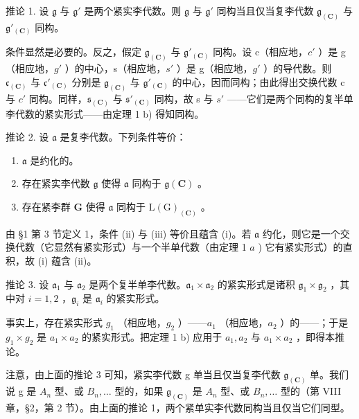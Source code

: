 推论 1. 设 \(\mathfrak{g}\) 与 \(\mathfrak{g}'\) 是两个紧实李代数。则 \(\mathfrak{g}\) 与 \(\mathfrak{g}'\) 同构当且仅当复李代数 \(\mathfrak{g}_{(\mathbf{C})}\) 与 \(\mathfrak{g}'_{(\mathbf{C})}\) 同构。

条件显然是必要的。反之，假定 \(\mathfrak{g}_{(\mathbf{C})}\) 与 \(\mathfrak{g}'_{(\mathbf{C})}\) 同构。设 c（相应地，\(c'\) ）是 g（相应地，\(g'\) ）的中心，s（相应地，\(s'\) ）是 g（相应地，\(g'\) ）的导代数。则 \(\mathfrak{c}_{(\mathbf{C})}\) 与 \(\mathfrak{c}'_{(\mathbf{C})}\) 分别是 \(\mathfrak{g}_{(\mathbf{C})}\) 与 \(\mathfrak{g}'_{(\mathbf{C})}\) 的中心，因而同构；由此得出交换代数 c 与 \(c'\) 同构。同样，\(\mathfrak{s}_{(\mathbf{C})}\) 与 \(\mathfrak{s}'_{(\mathbf{C})}\) 同构，故 s 与 \(s'\) ——它们是两个同构的复半单李代数的紧实形式——由定理 1 b) 得知同构。

推论 2. 设 \(\mathfrak{a}\) 是复李代数。下列条件等价：

\begin{enumerate}
\def\labelenumi{(\roman{enumi})}
\item
  \(\mathfrak{a}\) 是约化的。
\item
  存在紧实李代数 \(\mathfrak{g}\) 使得 \(\mathfrak{a}\) 同构于 \(\mathfrak{g}(\mathbf{C})\) 。
\item
  存在紧李群 \(\mathbf{G}\) 使得 \(\mathfrak{a}\) 同构于 \(\mathrm{L}(\mathrm{G})_{(\mathbf{C})}\) 。
\end{enumerate}

由 §1 第 3 节定义 1，条件 (ii) 与 (iii) 等价且蕴含 (i)。若 \(\mathfrak{a}\) 约化，则它是一个交换代数（它显然有紧实形式）与一个半单代数（由定理 1 \(a\) ) 它有紧实形式）的直积，故 (i) 蕴含 (ii)。

推论 3. 设 \(\mathfrak{a}_1\) 与 \(\mathfrak{a}_2\) 是两个复半单李代数。\(\mathfrak{a}_1 \times \mathfrak{a}_2\) 的紧实形式是诸积 \(\mathfrak{g}_1 \times \mathfrak{g}_2\) ，其中对 \(i = 1, 2\) ，\(\mathfrak{g}_i\) 是 \(\mathfrak{a}_i\) 的紧实形式。

事实上，存在紧实形式 \(g_{1}\) （相应地，\(g_{2}\) ）——\(a_{1}\) （相应地，\(a_{2}\) ）的——；于是 \(g_{1} \times g_{2}\) 是 \(a_{1} \times a_{2}\) 的紧实形式。把定理 1 b) 应用于 \(a_{1}, a_{2}\) 与 \(a_{1} \times a_{2}\) ，即得本推论。

注意，由上面的推论 3 可知，紧实李代数 g 单当且仅当复李代数 \(\mathfrak{g}_{(\mathbf{C})}\) 单。我们说 g 是 \(A_{n}\) 型、或 \(B_{n}, \ldots\) 型的，如果 \(\mathfrak{g}_{(\mathbf{C})}\) 是 \(A_{n}\) 型、或 \(B_{n}, \ldots\) 型的（第 VIII 章，§2，第 2 节）。由上面的推论 1，两个紧单实李代数同构当且仅当它们同型。

